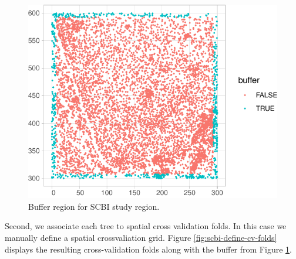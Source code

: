 \documentclass[12pt]{article}
\newenvironment{Shaded}{\begin{snugshade}}{\end{snugshade}}
\newcommand{\DataTypeTok}[1]{\textcolor[rgb]{0.13,0.29,0.53}{#1}}
\newcommand{\DecValTok}[1]{\textcolor[rgb]{0.00,0.00,0.81}{#1}}
\newcommand{\FloatTok}[1]{\textcolor[rgb]{0.00,0.00,0.81}{#1}}
\newcommand{\KeywordTok}[1]{\textcolor[rgb]{0.13,0.29,0.53}{\textbf{#1}}}
\newcommand{\NormalTok}[1]{#1}
\newcommand{\OperatorTok}[1]{\textcolor[rgb]{0.81,0.36,0.00}{\textbf{#1}}}
\newcommand{\StringTok}[1]{\textcolor[rgb]{0.31,0.60,0.02}{#1}}
\begin{document}
\begin{Shaded}
\end{Shaded}

\begin{figure}

{\centering \includegraphics[width=0.5\linewidth]{Figures/scbi-define-buffer-1} 

}

\caption{Buffer region for SCBI study region.}\label{fig:scbi-define-buffer}
\end{figure}

Second, we associate each tree to spatial cross validation folds. In
this case we manually define a spatial crossvaliation grid. Figure
\ref{fig:scbi-define-cv-folds} displays the resulting cross-validation
folds along with the buffer from Figure \ref{fig:scbi-define-buffer}.
\end{document}
